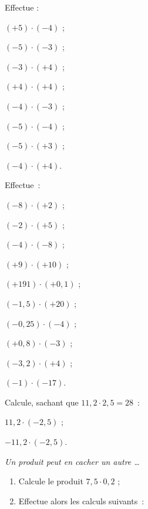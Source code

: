 \begin{exercice}
Effectue :
\begin{colenumerate}{2}
 \item $(+ 5) \cdot (- 4)$ ;
 \item $(- 5) \cdot (- 3)$ ;
 \item $(- 3) \cdot (+ 4)$ ;
 \item $(+ 4) \cdot (+ 4)$ ;
 \item $(- 4) \cdot (- 3)$ ;
 \item $(- 5) \cdot (- 4)$ ;
 \item $(- 5) \cdot (+ 3)$ ;
 \item $(- 4) \cdot (+ 4)$.
 \end{colenumerate}
\end{exercice}


\begin{exercice}
Effectue :
\begin{colenumerate}{2}
 \item $(- 8) \cdot (+ 2)$ ;
 \item $(- 2) \cdot (+ 5) $ ;
 \item $(- 4) \cdot (- 8)$ ;
 \item $(+ 9) \cdot (+ 10)$ ; 
 \item $(+ 191) \cdot (+ 0,1)$ ; 
 \item $(- 1,5) \cdot (+ 20)$ ;
 \item $(- 0,25) \cdot (- 4)$ ;
 \item $(+ 0,8) \cdot (- 3)$ ;
 \item $(- 3,2) \cdot (+ 4)$ ;
 \item \phantom{.} $(- 1) \cdot (- 17)$.
 \end{colenumerate}
\end{exercice}


\begin{exercice}
Calcule, sachant que $11,2 \cdot 2,5 = 28$ :
\begin{colenumerate}{2}
 \item $11,2 \cdot (- 2,5)$ ;
 \item $- 11,2 \cdot (- 2,5)$.
 \end{colenumerate}
\end{exercice}


\begin{exercice}
\emph{Un produit peut en cacher un autre \ldots}
\begin{enumerate}
 \item Calcule le produit $7,5 \cdot 0,2$ ;
 \item Effectue alors les calculs suivants :
 \end{enumerate}
\end{exercice}


